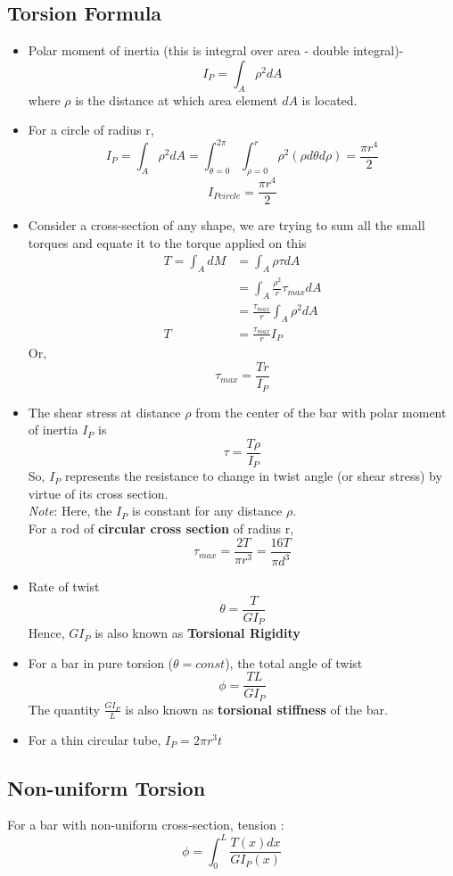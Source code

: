 \documentclass{article}
\begin{document}
	\subsection{Torsion Formula}
	\begin{itemize}
		\item Polar moment of inertia (this is integral over area - double integral)-
		\[\boxed{I_P = \int_A \rho^2 dA}\]
		where $\rho$ is the distance at which area element $dA$ is located.
		\item For a circle of radius r, 
		\[I_P = \int_A \rho^2 dA = \int_{\theta = 0}^{2\pi}\int_{\rho = 0}^r \rho^2 (\rho d\theta d\rho) = \frac{\pi r^4}{2} \]
		\[\boxed{I_{Pcircle} = \frac{\pi r^4}{2}}\]
		\item Consider a cross-section of any shape, we are trying to sum all the small torques and equate it to the torque applied on this
		\begin{align*}
			T = \int_A dM &= \int_A \rho \tau dA\\
						  &= \int_A \frac{\rho^2}{r}\tau_{max} dA\\
						  &= \frac{\tau_{max}}{r} \int_A \rho^2 dA\\
						T &= \frac{\tau_{max}}{r} I_P
		\end{align*}
		Or,
		\[\tau_{max} = \frac{Tr}{I_P}\]
		\item The shear stress at distance $\rho$ from the center of the bar with polar moment of inertia $I_P$ is
		\[\boxed{\tau = \frac{T\rho}{I_P}}\]
		So, $I_P$ represents the resistance to change in twist angle (or shear stress) by virtue of its cross section.\\
		\emph{Note}: Here, the $I_P$ is constant for any distance $\rho$.\\
		For a rod of \textbf{circular cross section} of radius r,
		\[\tau_{max} = \frac{2T}{\pi r^3} = \frac{16T}{\pi d^3 }\]

		\item Rate of twist
		\[\theta = \frac{T}{GI_P}\]
		Hence, $GI_P$ is also known as \textbf{Torsional Rigidity}
		\item For a bar in pure torsion ($\theta = const$), the total angle of twist
		\[\boxed{\phi = \frac{TL}{GI_P}}\]
		The quantity $\frac{G I_P}{L}$ is also known as \textbf{torsional stiffness} of the bar.

		\item For a thin circular tube, $I_P = 2 \pi r^3 t$
	\end{itemize}

	\subsection{Non-uniform Torsion}
		For a bar with non-uniform cross-section, tension  :
		\[\boxed{\phi = \int_0^L \frac{T(x) dx}{G I_P(x)}}\]
\end{document}
